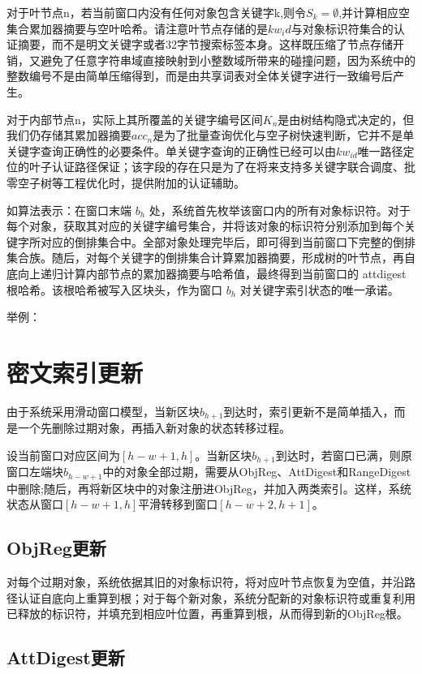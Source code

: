 对于叶节点n，若当前窗口内没有任何对象包含关键字k,则令$S_k = \emptyset$,并计算相应空集合累加器摘要与空叶哈希。请注意叶节点存储的是$kw_id$与对象标识符集合的认证摘要，而不是明文关键字或者32字节搜索标签本身。这样既压缩了节点存储开销，又避免了任意字符串域直接映射到小整数域所带来的碰撞问题，因为系统中的整数编号不是由简单压缩得到，而是由共享词表对全体关键字进行一致编号后产生。

对于内部节点n，实际上其所覆盖的关键字编号区间$K_n$是由树结构隐式决定的，但我们仍存储其累加器摘要$acc_n$是为了批量查询优化与空子树快速判断，它并不是单关键字查询正确性的必要条件。单关键字查询的正确性已经可以由$kw_{id}$唯一路径定位的叶子认证路径保证；该字段的存在只是为了在将来支持多关键字联合调度、批零空子树等工程优化时，提供附加的认证辅助。

如算法表示：在窗口末端 $b_h$ 处，系统首先枚举该窗口内的所有对象标识符。对于每个对象，获取其对应的关键字编号集合，并将该对象的标识符分别添加到每个关键字所对应的倒排集合中。全部对象处理完毕后，即可得到当前窗口下完整的倒排集合族。随后，对每个关键字的倒排集合计算累加器摘要，形成树的叶节点，再自底向上递归计算内部节点的累加器摘要与哈希值，最终得到当前窗口的 attdigest 根哈希。该根哈希被写入区块头，作为窗口 $b_h$ 对关键字索引状态的唯一承诺。

举例：

\section{密文索引更新}

由于系统采用滑动窗口模型，当新区块$b_{h+1}$到达时，索引更新不是简单插入，而是一个先删除过期对象，再插入新对象的状态转移过程。

设当前窗口对应区间为$[h-w+1,h]$。当新区块$b_{h+1}$到达时，若窗口已满，则原窗口左端块$b_{h-w+1}$中的对象全部过期，需要从ObjReg、AttDigest和RangeDigest中删除;随后，再将新区块中的对象注册进ObjReg，并加入两类索引。这样，系统状态从窗口$[h-w+1,h]$平滑转移到窗口$[h-w+2,h+1]$。

\subsection{ObjReg更新}
对每个过期对象，系统依据其旧的对象标识符，将对应叶节点恢复为空值，并沿路径认证自底向上重算到根；对于每个新对象，系统分配新的对象标识符或重复利用已释放的标识符，并填充到相应叶位置，再重算到根，从而得到新的ObjReg根。
\subsection{AttDigest更新}

